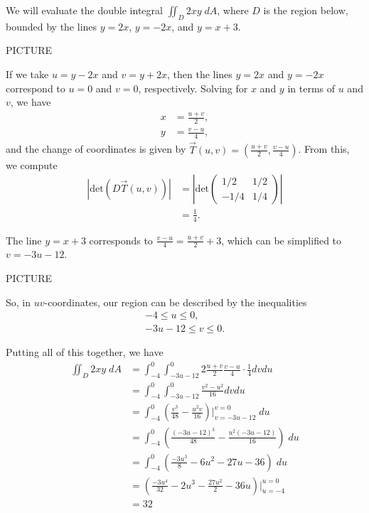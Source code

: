 \documentclass{ximera}
\begin{document}
\begin{example}
We will evaluate the double integral $\iint_D 2xy\;dA$, where $D$ is the region below, bounded by the lines $y=2x$, $y=-2x$, and $y=x+3$.

PICTURE

If we take $u=y-2x$ and $v=y+2x$, then the lines $y=2x$ and $y=-2x$ correspond to $u=0$ and $v=0$, respectively. Solving for $x$ and $y$ in terms of $u$ and $v$, we have
\begin{align*}
x &= \frac{u+v}{2},\\
y &= \frac{v-u}{4},
\end{align*}
and the change of coordinates is given by $\vec{T}(u,v) = \left(\frac{u+v}{2}, \frac{v-u}{4}\right)$. From this, we compute
\begin{align*}
\left|\text{det}(D\vec{T}(u,v))\right| &= \left|\text{det}\begin{pmatrix}1/2 & 1/2\\ -1/4 & 1/4\end{pmatrix}\right|\\
&= \frac{1}{4}.
\end{align*}

The line $y=x+3$ corresponds to $\frac{v-u}{4} = \frac{u+v}{2} + 3$, which can be simplified to $v= -3u-12$.

PICTURE

So, in $uv$-coordinates, our region can be described by the inequalities
\begin{align*}
-4\leq u\leq 0,\\
-3u-12\leq v\leq 0.
\end{align*}

Putting all of this together, we have
\begin{align*}
\iint_D 2xy\;dA &= \int_{-4}^0\int_{-3u-12}^0 2\frac{u+v}{2}\frac{v-u}{4}\cdot\frac{1}{4}dvdu\\
&= \int_{-4}^0\int_{-3u-12}^0 \frac{v^2-u^2}{16}dvdu\\
&= \int_{-4}^0\left(\frac{v^3}{48}-\frac{u^2v}{16}\right)|_{v = -3u-12}^{v=0}\;du\\
&= \int_{-4}^0\left(\frac{(-3u-12)^3}{48}-\frac{u^2(-3u-12)}{16}\right)\;du\\
&= \int_{-4}^0\left(\frac{-3u^3}{8} - 6u^2 - 27u - 36\right)\;du\\
&= \left(\frac{-3u^4}{32} - 2u^3 - \frac{27u^2}{2} - 36u\right)|_{u=-4}^{u=0}\\
&= 32
\end{align*}


\end{example}
\end{document}
